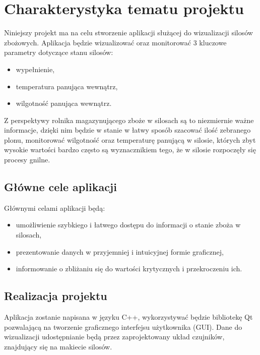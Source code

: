 \section{Charakterystyka tematu projektu} \label{ch: 1}
    Niniejszy projekt ma na celu stworzenie aplikacji służącej do wizualizacji silosów zbożowych. Aplikacja będzie wizualizować oraz 
    monitorować 3 kluczowe parametry dotyczące stanu silosów:
    \begin{itemize}
        \item wypełnienie,
        \item temperatura panująca wewnątrz,
        \item wilgotność panująca wewnątrz.
    \end{itemize} 
    Z perspektywy rolnika magazynującego zboże w silosach są to niezmiernie ważne informacje, dzięki nim będzie w stanie 
    w łatwy sposób szacować ilość zebranego plonu, monitorować wilgotność oraz temperaturę
    panującą w silosie, których zbyt wysokie wartości bardzo często są 
    wyznacznikiem tego, że w silosie rozpoczęły się procesy gnilne.
    \subsection{Główne cele aplikacji}
        Głównymi celami aplikacji będą:
        \begin{itemize}
            \item umożliwienie szybkiego i łatwego dostępu do informacji o stanie zboża w silosach,
            \item prezentowanie danych w przyjemniej i intuicyjnej formie graficznej,
            \item informowanie o zbliżaniu się do wartości krytycznych i przekroczeniu ich.
        \end{itemize}
    \subsection{Realizacja projektu}
            Aplikacja zostanie napisana w języku C++, wykorzystywać będzie bibliotekę Qt pozwalającą na tworzenie graficznego interfejsu użytkownika
            (GUI). Dane do wizualizacji udostępnianie będą przez zaprojektowany układ czujników, znajdujący się na makiecie silosów. 
    

   
